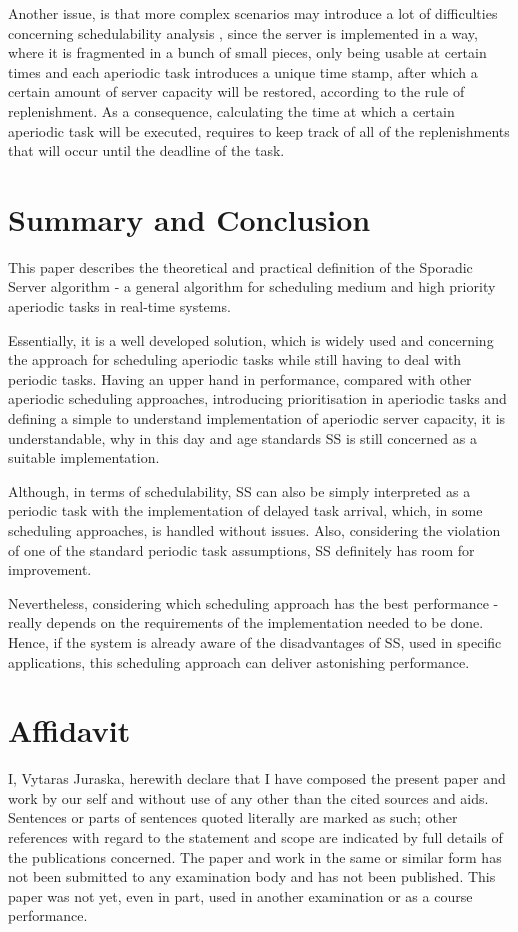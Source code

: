 \documentclass[conference]{IEEEtran}
\begin{document}
Another issue, is that more complex scenarios may introduce a lot of difficulties concerning schedulability analysis \cite{b1}, since the server is implemented in a way, where it is fragmented in a bunch of small pieces, only being usable at certain times and each aperiodic task introduces a unique time stamp, after which a certain amount of server capacity will be restored, according to the rule of replenishment. As a consequence, calculating the time at which a certain aperiodic task will be executed, requires to keep track of all of the replenishments that will occur until the deadline of the task.

\section{Summary and Conclusion}
This paper describes the theoretical and practical definition of the Sporadic Server algorithm - a general algorithm for scheduling medium and high priority aperiodic tasks in real-time systems. 

Essentially, it is a well developed solution, which is widely used and concerning the approach for scheduling aperiodic tasks while still having to deal with periodic tasks. Having an upper hand in performance, compared with other aperiodic scheduling approaches, introducing prioritisation in aperiodic tasks and defining a simple to understand implementation of aperiodic server capacity, it is understandable, why in this day and age standards SS is still concerned as a suitable implementation. 

Although, in terms of schedulability, SS can also be simply interpreted as a periodic task with the implementation of delayed task arrival, which, in some scheduling approaches, is handled without issues. Also, considering the violation of one of the standard periodic task assumptions, SS definitely has room for improvement. 

Nevertheless, considering which scheduling approach has the best performance - really depends on the requirements of the implementation needed to be done. Hence, if the system is already aware of the disadvantages of SS, used in specific applications, this scheduling approach can deliver astonishing performance.



\section{Affidavit}
I, Vytaras Juraska, herewith declare that I have composed the present paper and work by our self and without use of any other than the cited sources and aids. Sentences or parts of sentences quoted literally are marked as such; other references with regard to the statement and scope are indicated by full details of the publications concerned. The paper and work in the same or similar form has not been submitted to any examination body and has not been published. This paper was not yet, even in part, used in another examination or as a course performance.
\end{document}
